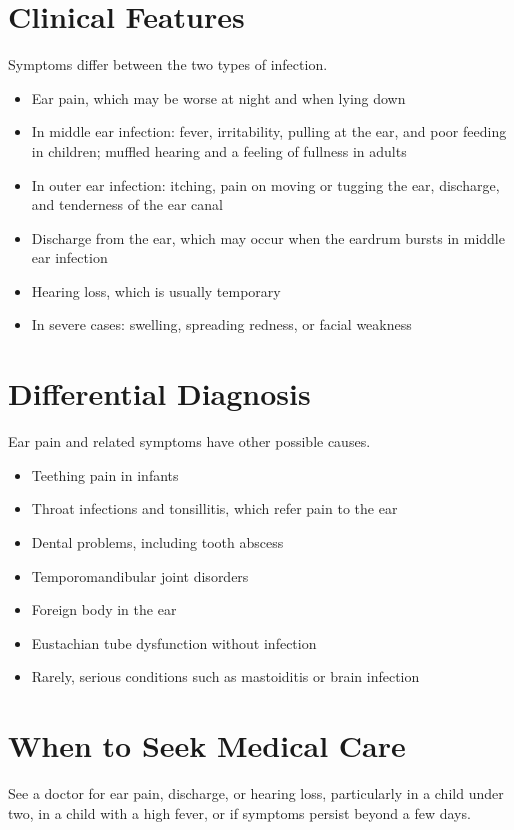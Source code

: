 \section*{Clinical Features}
Symptoms differ between the two types of infection.
\begin{itemize}
    \item Ear pain, which may be worse at night and when lying down
    \item In middle ear infection: fever, irritability, pulling at the ear, and poor feeding in children; muffled hearing and a feeling of fullness in adults
    \item In outer ear infection: itching, pain on moving or tugging the ear, discharge, and tenderness of the ear canal
    \item Discharge from the ear, which may occur when the eardrum bursts in middle ear infection
    \item Hearing loss, which is usually temporary
    \item In severe cases: swelling, spreading redness, or facial weakness
\end{itemize}

\section*{Differential Diagnosis}
Ear pain and related symptoms have other possible causes.
\begin{itemize}
    \item Teething pain in infants
    \item Throat infections and tonsillitis, which refer pain to the ear
    \item Dental problems, including tooth abscess
    \item Temporomandibular joint disorders
    \item Foreign body in the ear
    \item Eustachian tube dysfunction without infection
    \item Rarely, serious conditions such as mastoiditis or brain infection
\end{itemize}

\section*{When to Seek Medical Care}
See a doctor for ear pain, discharge, or hearing loss, particularly in a child under two, in a child with a high fever, or if symptoms persist beyond a few days.

